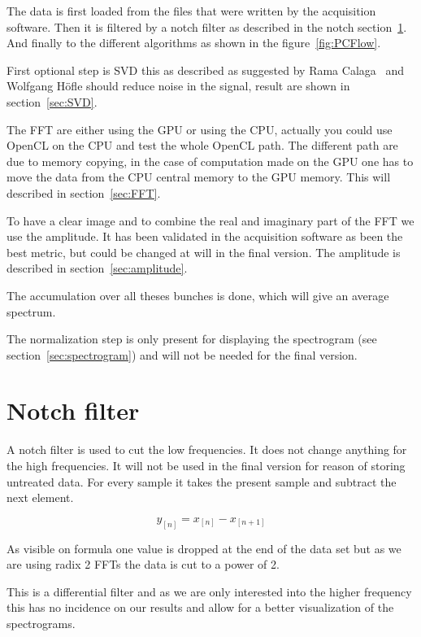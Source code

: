 	The data is first loaded from the files that were written by the acquisition software. Then it is filtered by a notch filter as described in the notch section~\ref{sec:notch}. And finally to the different algorithms as shown in the figure~\ref{fig:PCFlow}.

	First optional step is \gls{SVD} this as described as suggested by Rama Calaga~\cite{PhysRevSTAB.7.042801} and Wolfgang H{\"o}f\/le\cite{HofleChamonix12} should reduce noise in the signal, result are shown in section~\ref{sec:SVD}.

	The \gls{FFT} are either using the \gls{GPU} or using the \gls{CPU}, actually you could use \gls{OpenCL} on the \gls{CPU} and test the whole \gls{OpenCL} path. The different path are due to memory copying, in the case of computation made on the \gls{GPU} one has to move the data from the \gls{CPU} central memory to the \gls{GPU} memory. This will described in section~\ref{sec:FFT}.

	To have a clear image and to combine the real and imaginary part of the \gls{FFT} we use the amplitude. It has been validated in the acquisition software as been the best metric, but could be changed at will in the final version. The amplitude is described in section~\ref{sec:amplitude}.

	The accumulation over all theses bunches is done, which will give an average spectrum.

	The normalization step is only present for displaying the spectrogram (see section~\ref{sec:spectrogram}) and will not be needed for the final version.
 
\section{Notch filter}
\label{sec:notch}

A notch filter is used to cut the low frequencies. It does not change anything for the high frequencies. It will not be used in the final version for reason of storing untreated data. For every sample it takes the present sample and subtract the next element. 

$$y_{[n]} = x_{[n]} - x_{[n + 1]}$$

As visible on formula one value is dropped at the end of the data set but as we are using radix 2 \glspl{FFT} the data is cut to a power of 2.

This is a differential filter and as we are only interested into the higher frequency this has no incidence on our results and allow for a better visualization of the spectrograms.

